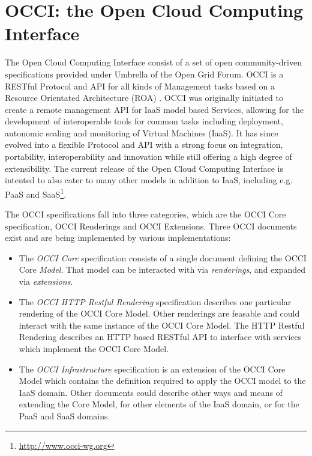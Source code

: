 \documentclass[10pt,conference,final,letterpaper,twoside,twocolumn,]{IEEEtran}
\newcommand{\I}[1]{\textit{#1}}
\begin{document}
\section{OCCI: the Open Cloud Computing Interface}
\label{sec:occi}

 The Open Cloud Computing Interface consist of a set of open
 community-driven specifications provided under Umbrella of the Open
 Grid Forum. OCCI is a RESTful \cite{REST_Fielding} Protocol and API
 for all kinds of Management tasks based on a Resource Orientated
 Architecture (ROA) \cite{RR2007}. OCCI was originally initiated to
 create a remote management API for IaaS model based Services,
 allowing for the development of interoperable tools for common tasks
 including deployment, autonomic scaling and monitoring of Virtual
 Machines (IaaS). It has since evolved into a flexible Protocol and
 API with a strong focus on integration, portability, interoperability
 and innovation while still offering a high degree of
 extensibility. The current release of the Open Cloud Computing
 Interface is intented to also cater to many other models in addition
 to IaaS, including e.g. PaaS and
 SaaS\footnote{\url{http://www.occi-wg.org}}.

 The OCCI specifications fall into three categories, which are the
 OCCI Core specification, OCCI Renderings and OCCI Extensions.  Three
 OCCI documents exist and are being implemented by various
 implementations:
 
 \begin{itemize}

  \item The \I{OCCI Core} specification consists of a single document
  defining the OCCI Core \I{Model}. That model can be interacted with
  via \I{renderings}, and expanded via \I{extensions}.

  \item The \I{OCCI HTTP Restful Rendering} specification describes
  one particular rendering of the OCCI Core Model. Other renderings
  are feasable and could interact with the same instance of the OCCI
  Core Model.  The HTTP Restful Rendering describes an HTTP based
  RESTful API to interface with services which implement the OCCI Core
  Model.
 
  \item The \I{OCCI Infrastructure} specification is an extension of
  the OCCI Core Model which contains the definition required to apply
  the OCCI model to the IaaS domain. Other documents could describe
  other ways and means of extending the Core Model, for other elements
  of the IaaS domain, or for the PaaS and SaaS domains.

 \end{itemize}
\end{document}
